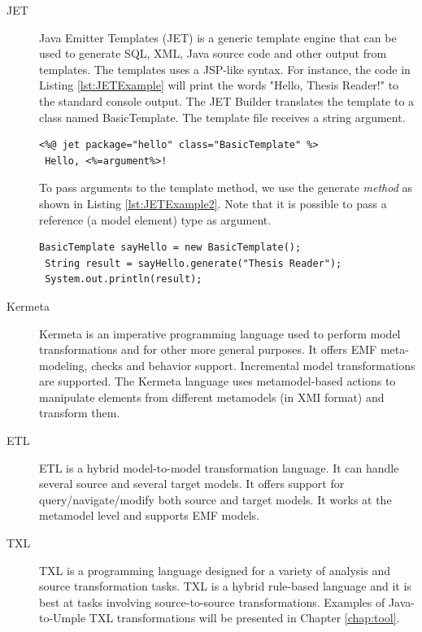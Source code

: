 \begin{description}
\item[JET]
Java Emitter Templates (JET) is a generic template engine that can be used to generate SQL, XML, Java source code and other output from templates. The templates uses a JSP-like syntax.
For instance, the code in Listing \ref{lst:JETExample} will print the words "Hello, Thesis Reader!" to the standard console output. The JET Builder translates the template to a class named BasicTemplate. The template file receives a string argument.


\begin{lstlisting}[style=java,label=lst:JETExample, caption=A basic JET Template]
<%@ jet package="hello" class="BasicTemplate" %>
 Hello, <%=argument%>!
\end{lstlisting}

To pass arguments to the template method, we use the generate \textit{method} as shown in Listing \ref{lst:JETExample2}. Note that it is possible to pass a reference (a model element) type as argument. 

\begin{lstlisting}[style=java,label=lst:JETExample2, caption=Instantiating the BasicTemplate class]
 BasicTemplate sayHello = new BasicTemplate();
 String result = sayHello.generate("Thesis Reader");
 System.out.println(result);
\end{lstlisting}

\item[Kermeta]
Kermeta \cite{kermetaMain} is an imperative programming language used to perform model transformations and for other more general purposes. It offers EMF meta-modeling, checks and behavior support. Incremental model transformations are supported. The Kermeta language uses metamodel-based actions to manipulate elements from different metamodels (in XMI format) and transform them. 

\item[ETL]
ETL \cite{ETLMain}  is a hybrid model-to-model transformation language. It can handle several source and several target models. It offers support for query/navigate/modify both source and target models. It works at the metamodel level and supports EMF models. 

\item[TXL]
TXL \cite{Cordy2006}  is a programming language designed for a variety of analysis and source transformation tasks. TXL is a hybrid rule-based language and it is best at tasks involving source-to-source transformations.  Examples of Java-to-Umple TXL transformations will be presented in Chapter \ref{chap:tool}.
\end{description}

